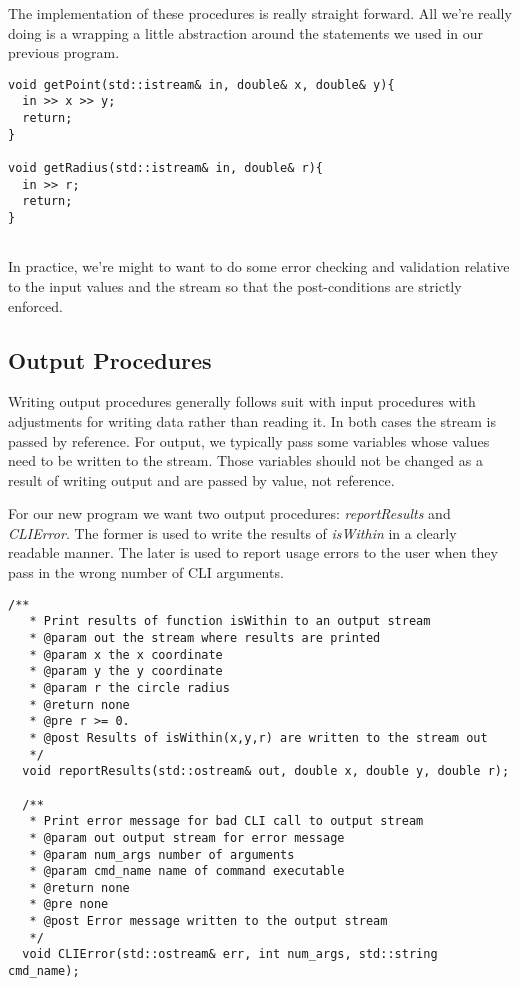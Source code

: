 \documentclass[]{tufte-handout}
\begin{document}
The implementation of these procedures is really straight forward. All we're really doing is a wrapping a little abstraction around the statements we used in our previous program. 
\begin{verbatim}
void getPoint(std::istream& in, double& x, double& y){
  in >> x >> y;
  return;
}

void getRadius(std::istream& in, double& r){
  in >> r;
  return;
}
	
\end{verbatim}
In practice, we're might to want to do some error checking and validation relative to the input values and the stream so that the post-conditions are strictly enforced.

\subsection{Output Procedures}

Writing output procedures generally follows suit with input procedures with adjustments for writing data rather than reading it. In both cases the stream is passed by reference. For output, we typically pass some variables whose values need to be written to the stream. Those variables should not be changed as a result of writing output and are passed by value, not reference. 

For our new program we want two output procedures: \textit{reportResults} and \textit{CLIError}. The former is used to write the results of \textit{isWithin} in a clearly readable manner. The later is used to report usage errors to the user when they pass in the wrong number of CLI arguments. 
\begin{verbatim}
/**
   * Print results of function isWithin to an output stream
   * @param out the stream where results are printed
   * @param x the x coordinate
   * @param y the y coordinate
   * @param r the circle radius
   * @return none
   * @pre r >= 0.
   * @post Results of isWithin(x,y,r) are written to the stream out
   */
  void reportResults(std::ostream& out, double x, double y, double r);

  /**
   * Print error message for bad CLI call to output stream
   * @param out output stream for error message
   * @param num_args number of arguments
   * @param cmd_name name of command executable
   * @return none
   * @pre none
   * @post Error message written to the output stream
   */
  void CLIError(std::ostream& err, int num_args, std::string cmd_name);
\end{verbatim}
\end{document}

